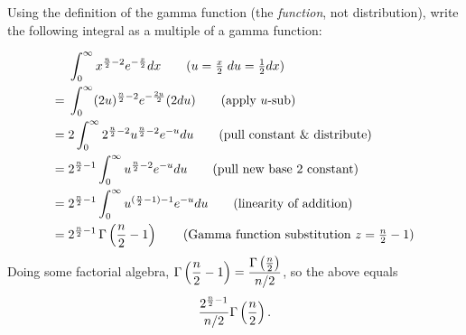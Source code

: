 Using the definition of the gamma function (the \textit{function}, not distribution), write
the following integral as a multiple of a gamma function:

\begin{align*}
    &\; \int_0^{\infty} x^{\frac{n}{2} -2} e^{-\frac{x}{2}} dx \tag{$u = \frac{x}{2}\; du = \over{2}dx$}\\
    =&\; \int_0^{\infty} (2u)^{\frac{n}{2} - 2} e^{-\frac{2u}{2}} (2du) \tag{apply $u$-sub}\\
    =&\; 2 \int_0^{\infty} 2^{\frac{n}{2} - 2} u^{\frac{n}{2} - 2} e^{-u} du \tag{pull constant \& distribute}\\
    =&\; 2^{\frac{n}{2} - 1} \int_0^{\infty} u^{\frac{n}{2} - 2} e^{-u} du \tag{pull new base 2 constant}\\
    =&\; 2^{\frac{n}{2}-1} \int_0^{\infty} u^{(\frac{n}{2} - 1) - 1} e^{-u} du \tag{linearity of addition}\\
    =&\; 2^{\frac{n}{2}-1} \, \Gamma\pars{\frac{n}{2} - 1} \tag{Gamma function substitution $z = \frac{n}{2} - 1$}
\end{align*}
Doing some factorial algebra, $\displaystyle \Gamma\pars{\frac{n}{2} - 1} = \frac{\Gamma\pars{\frac{n}{2}}}{n/2}$, so the above equals
$$\frac{2^{\frac{n}{2}-1}}{n/2} \Gamma \pars{\frac{n}{2}}.$$
